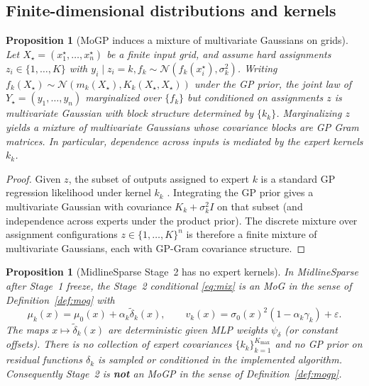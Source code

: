 \documentclass[11pt,a4paper]{article}
\theoremstyle{plain}
\newtheorem{proposition}[theorem]{Proposition}
\theoremstyle{definition}
\theoremstyle{remark}
\newcommand{\Ncal}{\mathcal{N}}
\newcommand{\Kmax}{K_{\max}}
\begin{document}
\subsection{Finite-dimensional distributions and kernels}
\begin{proposition}[MoGP induces a mixture of multivariate Gaussians on grids]
\label{prop:mogp-fdd}
Let \(X_\star=(x_1^\star,\dots,x_n^\star)\) be a finite input grid, and assume hard
assignments \(z_i\in\{1,\dots,K\}\) with \(y_i\mid z_i=k,f_k\sim\Ncal(f_k(x_i^\star),\sigma_k^2)\).
Writing \(f_k(X_\star)\sim\Ncal(m_k(X_\star),K_k(X_\star,X_\star))\) under the GP prior,
the joint law of \(Y_\star=(y_1,\dots,y_n)\) marginalized over \(\{f_k\}\) but conditioned
on assignments \(z\) is multivariate Gaussian with block structure determined by
\(\{k_k\}\). Marginalizing \(z\) yields a \emph{mixture of multivariate Gaussians}
whose covariance blocks are GP Gram matrices.
In particular, dependence across inputs is mediated by the expert kernels \(k_k\).
\end{proposition}

\begin{proof}
Given \(z\), the subset of outputs assigned to expert \(k\) is a standard GP regression
likelihood under kernel \(k_k\) \citep{RasmussenWilliams2006}. Integrating the GP prior
gives a multivariate Gaussian with covariance \(K_k+\sigma_k^2 I\) on that subset
(and independence across experts under the product prior). The discrete mixture over
assignment configurations \(z\in\{1,\dots,K\}^n\) is therefore a finite mixture of
multivariate Gaussians, each with GP-Gram covariance structure.
\end{proof}

\begin{proposition}[MidlineSparse Stage~2 has no expert kernels]
\label{prop:ms-no-expert-kernel}
In MidlineSparse after Stage~1 freeze, the Stage~2 conditional \eqref{eq:mix} is an MoG
in the sense of Definition~\ref{def:mog} with
\[
  \mu_k(x)=\mu_0(x)+\alpha_k\tilde\delta_k(x),
  \qquad
  v_k(x)=\sigma_0(x)^2(1-\alpha_k\gamma_k)+\varepsilon.
\]
The maps \(x\mapsto\tilde\delta_k(x)\) are deterministic given MLP weights \(\psi_\delta\)
(or constant offsets). There is no collection of expert covariances
\(\{k_k\}_{k=1}^{\Kmax}\) and no GP prior on residual functions \(\delta_k\) is sampled
or conditioned in the implemented algorithm.
Consequently Stage~2 is \textbf{not} an MoGP in the sense of Definition~\ref{def:mogp}.
\end{proposition}
\end{document}
